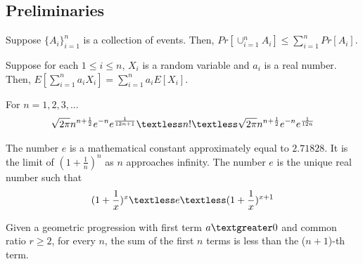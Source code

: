 \subsection{Preliminaries}
\begin{lemma}\label{union}
Suppose $\{A_i\}_{i=1}^n$ is a collection of events. Then, $Pr[\cup_{i=1}^{n}A_i]\le\sum_{i=1}^{n}Pr[A_i]$.
\end{lemma}
\begin{lemma}\label{linearity}
Suppose for each $1 \le i \le n$, $X_i$ is a random variable and $a_i$ is a real number. Then, $E[\sum_{i=1}^na_iX_i]=\sum_{i=1}^{n}a_iE[X_i]$.
\end{lemma}
\begin{lemma}\label{Stirling}
 For $n=1,2,3,...$
\begin{align}
    \nonumber \sqrt{2\pi}n^{n+\frac{1}{2}}e^{-n}e^{\frac{1}{12n+1}}\textless n! \textless \sqrt{2\pi}n^{n+\frac{1}{2}}e^{-n}e^{\frac{1}{12n}} 
\end{align}
\end{lemma}
\begin{definition}\label{e}
The number $e$ is a mathematical constant approximately equal to $2.71828$. It is the limit of $(1+\frac{1}{n})^n$ as $n$ approaches infinity. The number $e$ is the unique real number such that
\begin{align}
    \nonumber (1+\frac{1}{x})^{x} \textless e \textless (1+\frac{1}{x})^{x+1}
\end{align}
\end{definition}
\begin{lemma}\label{gp}
Given a geometric progression with first term $a \textgreater 0$ and common ratio $r \ge 2$, for every $n$, the sum of the first $n$ terms is less than the ($n+1$)-th term.
\end{lemma}
